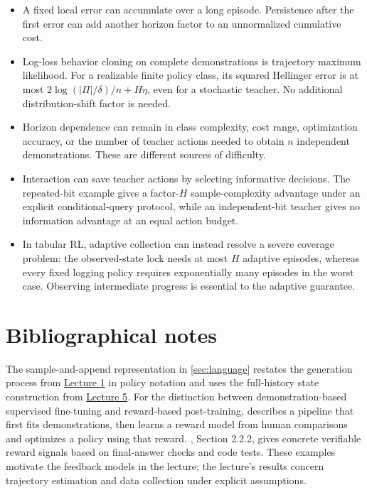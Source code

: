 \documentclass[11pt,twoside]{article}
\theoremstyle{definition}
\theoremstyle{remark}
\begin{document}
\begin{itemize}[leftmargin=*]
\item A fixed local error can accumulate over a long episode. Persistence
after the first error can add another horizon factor to an unnormalized
cumulative cost.
\item Log-loss behavior cloning on complete demonstrations is trajectory
maximum likelihood. For a realizable finite policy class, its squared
Hellinger error is at most $2\log(|\Pi|/\delta)/n+H\eta$, even for a
stochastic teacher. No additional distribution-shift factor is needed.
\item Horizon dependence can remain in class complexity, cost range,
optimization accuracy, or the number of teacher actions needed to obtain
$n$ independent demonstrations. These are different sources of difficulty.
\item Interaction can save teacher actions by selecting informative
decisions. The repeated-bit example gives a factor-$H$ sample-complexity
advantage under an explicit conditional-query protocol, while an
independent-bit teacher gives no information advantage at an equal
action budget.
\item In tabular RL, adaptive collection can instead resolve a severe
coverage problem: the observed-state lock needs at most $H$ adaptive
episodes, whereas every fixed logging policy requires exponentially many
episodes in the worst case. Observing intermediate progress is essential
to the adaptive guarantee.
\end{itemize}

\clearpage
\printendnotes

\section*{Bibliographical notes}

The sample-and-append representation in \cref{sec:language} restates the generation
process from \href{lecture01.pdf}{Lecture 1} in policy notation and uses
the full-history state construction from \href{lecture05.pdf}{Lecture 5}.
For the distinction between demonstration-based supervised fine-tuning and
reward-based post-training, \citet{ouyang2022} describes a pipeline that
first fits demonstrations, then learns a reward model from human
comparisons and optimizes a policy using that reward.
\citet{deepseek2025}, Section 2.2.2, gives concrete verifiable reward
signals based on final-answer checks and code tests. These examples
motivate the feedback models in the lecture; the lecture's results concern
trajectory estimation and data collection under explicit assumptions.
\end{document}
